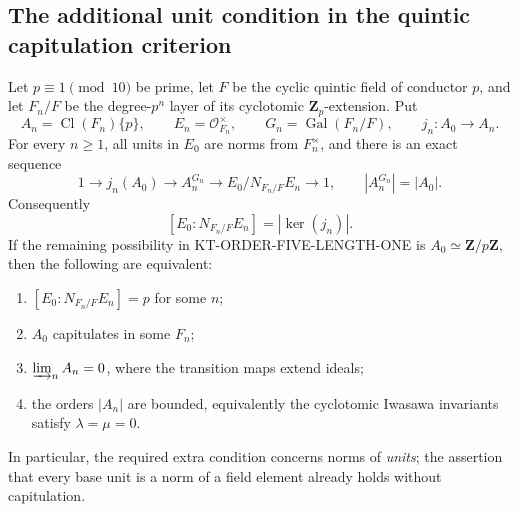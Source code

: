 \subsection{The additional unit condition in the quintic capitulation criterion}

\begin{proposition}
Let $p\equiv1\pmod {10}$ be prime, let $F$ be the cyclic quintic
field of conductor $p$, and let $F_n/F$ be the degree-$p^n$ layer
of its cyclotomic $\mathbf Z_p$-extension.  Put
\[
 A_n=\operatorname{Cl}(F_n)\{p\},\qquad
 E_n=\mathcal O_{F_n}^{\times},\qquad
 G_n=\operatorname{Gal}(F_n/F),
 \qquad j_n:A_0\longrightarrow A_n.
                                                        \tag{O5G.1}
\]
For every $n\ge1$, all units in $E_0$ are norms from
$F_n^{\times}$, and there is an exact sequence
\[
 1\longrightarrow j_n(A_0)\longrightarrow A_n^{G_n}
 \longrightarrow E_0/N_{F_n/F}E_n\longrightarrow1,
 \qquad |A_n^{G_n}|=|A_0|.                              \tag{O5G.2}
\]
Consequently
\[
 [E_0:N_{F_n/F}E_n]=|\ker(j_n)|.                        \tag{O5G.3}
\]
If the remaining possibility in KT-ORDER-FIVE-LENGTH-ONE is
$A_0\simeq\mathbf Z/p\mathbf Z$, then the following are equivalent:
\begin{enumerate}
\item $[E_0:N_{F_n/F}E_n]=p$ for some $n$;
\item $A_0$ capitulates in some $F_n$;
\item $\varinjlim_n A_n=0$, where the transition maps extend ideals;
\item the orders $|A_n|$ are bounded, equivalently the cyclotomic
      Iwasawa invariants satisfy $\lambda=\mu=0$.
\end{enumerate}
In particular, the required extra condition concerns norms of
\emph{units}; the assertion that every base unit is a norm of a
field element already holds without capitulation.
\end{proposition}

